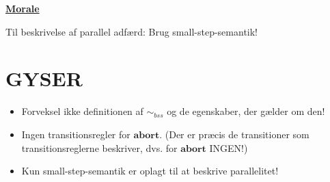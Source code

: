 \documentclass[a4paper,10pt,article]{memoir}
\theoremstyle{definition}
\begin{document}
\underline{\textbf{Morale}}

Til beskrivelse af parallel adfærd: Brug small-step-semantik!

\chapter{GYSER}

\begin{itemize}
\item Forveksel ikke definitionen af $\sim_{bss}$ og de egenskaber, der gælder om den!
\item Ingen transitionsregler for $\textbf{abort}$. (Der er præcis de transitioner som transitionsreglerne beskriver, dvs. for $\textbf{abort}$ INGEN!)
\item Kun small-step-semantik er oplagt til at beskrive parallelitet!
\end{itemize}
\end{document}
